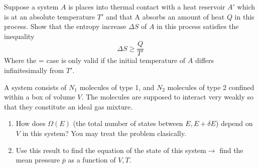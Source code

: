 \documentclass{article}
\begin{document}
    \begin{problem}[Reif 3.4]
        Suppose a system $A$ is places into thermal contact with a heat reservoir $A'$ which is at an absolute temperature $T'$ and that A absorbs an amount of heat $Q$ in this process. Show that the entropy increase $\Delta S$ of $A$ in this process satisfies the inequality $$\Delta S \geq \frac{Q}{T'}$$ Where the = case is only valid if the initial temperature of $A$ differs infinitesimally from $T'$. 
        \answerline
    \end{problem}\newpage
    \begin{problem}[Reif 3.5]
        A system consists of $N_1$ molecules of type 1, and $N_2$ molecules of type 2 confined within a box of volume $V$. The molecules are supposed to interact very weakly so that they constitute an ideal gas mixture. 
        \begin{enumerate}[label=(\alph*)]
            \item How does $\Omega(E)$ (the total number of states between $E,E+\delta E$) depend on $V$ in this system? You may treat the problem clasically. 
            \item Use this result to find the equation of the state of this system$\rightarrow$ find the mean pressure $\overline{p}$ as a function of $V,T$.
        \end{enumerate}
        \answerline
    \end{problem}
    \newpage 
\end{document}
